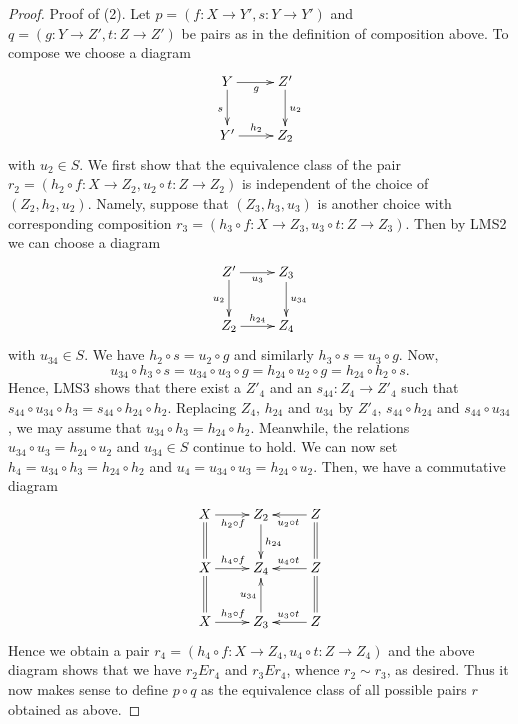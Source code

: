 \begin{proof}
\medskip\noindent
Proof of (2). Let $p = (f : X \to Y', s : Y \to Y')$ and
$q = (g : Y \to Z', t : Z \to Z')$ be pairs as in the definition of composition
above. To compose we choose a diagram
$$
\xymatrix{
Y \ar[d]_s \ar[r]_g & Z' \ar[d]^{u_2} \\
Y' \ar[r]^{h_2} & Z_2
}
$$
with $u_2 \in S$. We first show that the equivalence class of the pair
$r_2 = (h_2 \circ f : X \to Z_2, u_2 \circ t : Z \to Z_2)$
is independent of the choice of $(Z_2, h_2, u_2)$. Namely, suppose
that $(Z_3, h_3, u_3)$ is another choice with corresponding composition
$r_3 = (h_3 \circ f : X \to Z_3, u_3 \circ t : Z \to Z_3)$.
Then by LMS2 we can choose a diagram
$$
\xymatrix{
Z' \ar[d]_{u_2} \ar[r]_{u_3} & Z_3 \ar[d]^{u_{34}} \\
Z_2 \ar[r]^{h_{24}} & Z_4
}
$$
with $u_{34} \in S$. We have $h_2 \circ s = u_2 \circ g$
and similarly $h_3 \circ s = u_3 \circ g$. Now,
$$
u_{34} \circ h_3 \circ s
= u_{34} \circ u_3 \circ g
= h_{24} \circ u_2 \circ g
= h_{24} \circ h_2 \circ s.
$$
Hence, LMS3 shows that there
exist a $Z'_4$ and an $s_{44} : Z_4 \to Z'_4$ such that
$s_{44} \circ u_{34} \circ h_3 = s_{44} \circ h_{24} \circ h_2$.
Replacing $Z_4$, $h_{24}$ and $u_{34}$ by $Z'_4$,
$s_{44} \circ h_{24}$ and $s_{44} \circ u_{34}$, we may
assume that $u_{34} \circ h_3 = h_{24} \circ h_2$.
Meanwhile, the relations $u_{34} \circ u_3 = h_{24} \circ u_2$
and $u_{34} \in S$ continue to hold. We can now set
$h_4 = u_{34} \circ h_3 = h_{24} \circ h_2$ and
$u_4 = u_{34} \circ u_3 = h_{24} \circ u_2$. Then, we have a
commutative diagram
$$
\xymatrix{
X \ar@{=}[d] \ar[r]_{h_2\circ f} &
Z_2 \ar[d]^{h_{24}} &
Z \ar[l]^{u_2 \circ t} \ar@{=}[d] \\
X \ar@{=}[d] \ar[r]^{h_4\circ f} &
Z_4 &
Z \ar@{=}[d] \ar[l]_{u_4 \circ t} \\
X \ar[r]^{h_3 \circ f} &
Z_3 \ar[u]^{u_{34}} &
Z \ar[l]_{u_3 \circ t}
}
$$
Hence we obtain a pair
$r_4 =
(h_4 \circ f : X \to Z_4, u_4 \circ t : Z \to Z_4)$
and the above diagram shows that we have $r_2Er_4$ and
$r_3Er_4$, whence $r_2 \sim r_3$, as desired. Thus it now
makes sense to define $p \circ q$ as the equivalence class of
all possible pairs $r$ obtained as above.


\end{proof}
